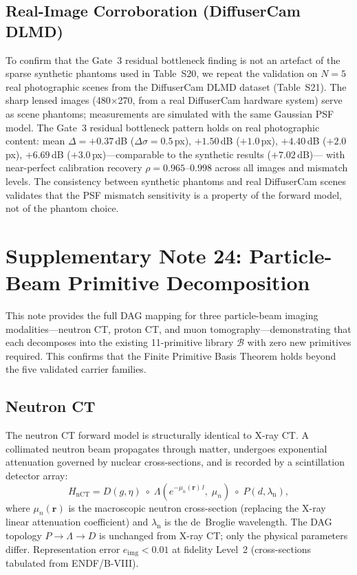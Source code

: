 \documentclass[11pt]{article}
\begin{document}
\subsection{Real-Image Corroboration (DiffuserCam DLMD)}
To confirm that the Gate~3 residual bottleneck finding is not an artefact of the sparse synthetic phantoms used in Table~S20,
we repeat the validation on $N{=}5$ real photographic scenes from the DiffuserCam DLMD dataset
\cite{Antipa2018} (Table~S21).
The sharp lensed images (480$\times$270, from a real DiffuserCam hardware system)
serve as scene phantoms; measurements are simulated with the same Gaussian PSF model.
The Gate~3 residual bottleneck pattern holds on real photographic content:
mean $\Delta{=}+0.37$\,dB ($\Delta\sigma{=}0.5$\,px), $+1.50$\,dB ($+1.0$\,px),
$+4.40$\,dB ($+2.0$\,px), $+6.69$\,dB ($+3.0$\,px)---comparable to the synthetic results ($+7.02$\,dB)---
with near-perfect calibration recovery $\rho{=}0.965$--$0.998$ across all images and mismatch levels.
The consistency between synthetic phantoms and real DiffuserCam scenes validates that the PSF mismatch
sensitivity is a property of the forward model, not of the phantom choice.


\section{Supplementary Note 24: Particle-Beam Primitive Decomposition}
\label{sec:note_particle_beams}

This note provides the full DAG mapping for three particle-beam imaging
modalities---neutron CT, proton CT, and muon tomography---demonstrating that
each decomposes into the existing 11-primitive library $\mathcal{B}$ with
zero new primitives required.  This confirms that the Finite Primitive Basis
Theorem holds beyond the five validated carrier families.

\subsection{Neutron CT}

The neutron CT forward model is structurally identical to X-ray CT.
A collimated neutron beam propagates through matter, undergoes exponential
attenuation governed by nuclear cross-sections, and is recorded by a
scintillation detector array:
\[
  H_{\mathrm{nCT}} = D(g,\eta) \;\circ\;
  \Lambda\!\left(e^{-\mu_n(\mathbf{r})\,l},\;\mu_n\right)
  \;\circ\; P(d,\lambda_{\mathrm{n}}),
\]
where $\mu_n(\mathbf{r})$ is the macroscopic neutron cross-section (replacing
the X-ray linear attenuation coefficient) and $\lambda_{\mathrm{n}}$ is the
de~Broglie wavelength.  The DAG topology $P \to \Lambda \to D$ is unchanged
from X-ray CT; only the physical parameters differ.  Representation error
$e_{\mathrm{img}} < 0.01$ at fidelity Level~2 (cross-sections tabulated from
ENDF/B-VIII).
\end{document}
